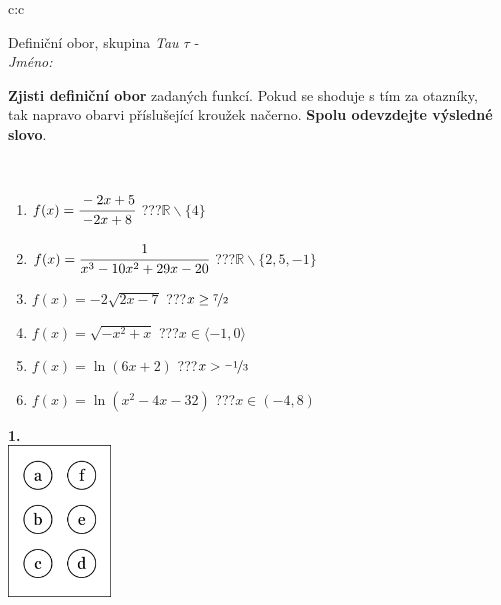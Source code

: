 \documentclass[10pt]{report}
\begin{document}
\begin{tabular}{c:c}
\begin{minipage}[c][104.5mm][t]{0.5\linewidth}
\begin{center}
\vspace{7mm}
{\huge Definiční obor, skupina \textit{Tau $\tau$} -}\\[5mm]
\textit{Jméno:}\phantom{xxxxxxxxxxxxxxxxxxxxxxxxxxxxxxxxxxxxxxxxxxxxxxxxxxxxxxxxxxxxxxxxx}\\[5mm]
\begin{minipage}{0.95\linewidth}
\begin{center}
\textbf{Zjisti definiční obor} zadaných funkcí. Pokud se shoduje s tím za otazníky,\\tak napravo obarvi příslušející kroužek načerno. \textbf{Spolu odevzdejte výsledné slovo}.
\end{center}
\end{minipage}
\\[1mm]
\begin{minipage}{0.79\linewidth}
\begin{center}
\begin{varwidth}{\linewidth}
\begin{enumerate}
\normalsizerrr
\item $f(x)=\cfrac{-2x+5}{-2x+8}$\quad \dotfill\; ???\;\dotfill \quad $\mathbb{R}\smallsetminus\{4\}$
\item $f(x)=\cfrac{1}{x^3-10x^2+29x-20}$\quad \dotfill\; ???\;\dotfill \quad $\mathbb{R}\smallsetminus\{2,5,-1\}$
\item $f(x)=-2\sqrt{2x-7}$\quad \dotfill\; ???\;\dotfill \quad $x\geq\nicefrac{7}{2}$
\item $f(x)=\sqrt{-x^2+x}$\quad \dotfill\; ???\;\dotfill \quad $x\in\langle-1 , 0\rangle$
\item $f(x)=\ln{(6x+2)}$\quad \dotfill\; ???\;\dotfill \quad $x>\nicefrac{-1}{3}$
\item $f(x)=\ln{(x^2-4x-32)}$\quad \dotfill\; ???\;\dotfill \quad $x\in(-4 , 8)$
\end{enumerate}
\end{varwidth}
\end{center}
\end{minipage}
\begin{minipage}{0.20\linewidth}
\begin{center}
{\Huge\bfseries 1.} \\[2mm]
\includegraphics[height=40mm]{../images/braille.png}

\end{center}
\end{minipage}
\end{center}
\end{minipage}
\end{tabular}
\end{document}
